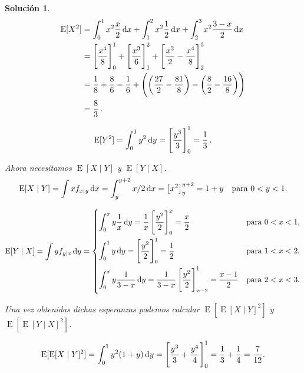 \documentclass[
  a4paper,
  spanish,
  12pt,
]{scrartcl}
\theoremstyle{ejercicio-style}
\theoremstyle{remark-style}
\newtheorem*{sol}{Solución}
\begin{document}
\begin{sol}
  \begin{align*}
    \operatorname{E}[X^2] &= \int_0^1 x^2\frac{x}{2}\dif x
       + \int_1^2 x^2\frac{1}{2} \dif x
       + \int_2^3 x^2\frac{3-x}{2} \dif x\\
      &= \left[\frac{x^4}{8}\right]^1_0
       + \left[\frac{x^3}{6}\right]^2_1
       + \left[\frac{x^3}{2} - \frac{x^4}{8}\right]^3_2\\
      &= \frac{1}{8} + \frac{8}{6} - \frac{1}{6} + \left(
        \left(\frac{27}{2} - \frac{81}{8}\right) - \left(\frac{8}{2} - \frac{16}{8}\right)
      \right)\\
      &= \frac{8}{3}\,.
  \end{align*}

  \begin{align*}
    \operatorname{E}[Y^2] = \int_0^1 y^2\dif y
       = \left[\frac{y^3}{3}\right]^1_0
       = \frac{1}{3}\,.
  \end{align*}

  Ahora necesitamos \(\operatorname{E}[X \mid Y]\) y \(\operatorname{E}[Y \mid X]\).
  \begin{align*}
    \operatorname{E}[X \mid Y] = \int x f_{x\mid y} \dif x = \int_{y}^{y+2} x/2 \dif x = \big[x^2\big]^{y+2}_y = 1 +y \quad \text{para } 0 < y < 1. 
  \end{align*}

  \begin{align*}
    \operatorname{E}[Y \mid X] = \int y f_{y\mid x} \dif y = \begin{dcases}
      \int_0^x y\frac{1}{x} \dif y = \frac{1}{x}\left[\frac{y^2}{2}\right]^x_0 = \frac{x}{2} & \text{para } 0 < x < 1,\\
      \int_0^1 y \dif y = \left[\frac{y^2}{2}\right]_0^1 = \frac{1}{2}  & \text{para } 1 < x < 2,\\
      \int_0^x y\frac{1}{3-x} \dif y = \frac{1}{3-x}\left[\frac{y^2}{2}\right]_{x-2}^1 = \frac{x-1}{2} & \text{para } 2 < x < 3.
    \end{dcases}
  \end{align*}

  Una vez obtenidas dichas esperanzas podemos calcular \(\operatorname{E}[\operatorname{E}[X \mid Y]^2]\) y \(\operatorname{E}[\operatorname{E}[Y \mid X]^2]\).

  \begin{align*}
    \operatorname{E}[\operatorname{E}[X \mid Y]^2]
     = \int_0^1 y^2(1+y) \dif y 
     = \left[\frac{y^3}{3} + \frac{y^4}{4}\right]_0^1 
     = \frac{1}{3} + \frac{1}{4} 
     = \frac{7}{12}.
  \end{align*}


\end{sol}
\end{document}
